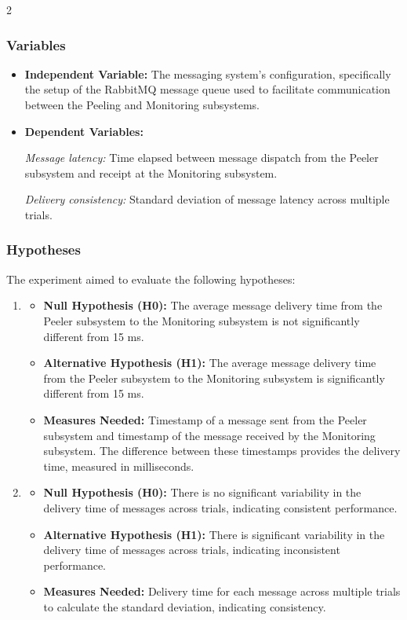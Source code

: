 \documentclass{article}
\begin{document}
\begin{multicols}{2}
\subsubsection{Variables}
\begin{itemize}
    \item \textbf{Independent Variable:} The messaging system's configuration, specifically the setup of the RabbitMQ message queue used to facilitate communication between the Peeling and Monitoring subsystems.
    \item \textbf{Dependent Variables:} 
    
    \textit{Message latency:} Time elapsed between message dispatch from the Peeler subsystem and receipt at the Monitoring subsystem.
    
    \textit{Delivery consistency:} Standard deviation of message latency across multiple trials.
\end{itemize}

\subsubsection{Hypotheses}
The experiment aimed to evaluate the following hypotheses:
\begin{enumerate}
    \item 
        \begin{itemize}
            \item \textbf{Null Hypothesis (H0):} The average message delivery time from the Peeler subsystem to the Monitoring subsystem is not significantly different from 15 ms.
            \item \textbf{Alternative Hypothesis (H1):} The average message delivery time from the Peeler subsystem to the Monitoring subsystem is significantly different from 15 ms.
            \item \textbf{Measures Needed:} Timestamp of a message sent from the Peeler subsystem and timestamp of the message received by the Monitoring subsystem. The difference between these timestamps provides the delivery time, measured in milliseconds.
        \end{itemize}
    \item 
        \begin{itemize}
            \item \textbf{Null Hypothesis (H0):} There is no significant variability in the delivery time of messages across trials, indicating consistent performance.
            \item \textbf{Alternative Hypothesis (H1):} There is significant variability in the delivery time of messages across trials, indicating inconsistent performance.
            \item \textbf{Measures Needed:} Delivery time for each message across multiple trials to calculate the standard deviation, indicating consistency.
        \end{itemize}
\end{enumerate}


\end{multicols}
\end{document}
